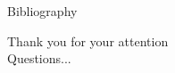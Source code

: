 \documentclass{beamer}
\begin{document}
\renewcommand*{\bibfont}{\scriptsize}
\setlength\bibitemsep{0pt}
\begin{frame}
\nocite{braekers_exact_2014}
\nocite{cordeau_dial--ride_2007}
\nocite{parragh_introducing_2011}
\nocite{parragh_hybrid_2013}
\nocite{ropke_models_2007}
\nocite{yang_firefly_2013}
\begin{block}{Bibliography}
\printbibliography[heading=none]
\end{block}
\end{frame}

\begin{frame}[c]
\begin{center}
\Huge Thank you for your attention\\
\huge Questions...
\end{center}
\end{frame}

\end{document}
